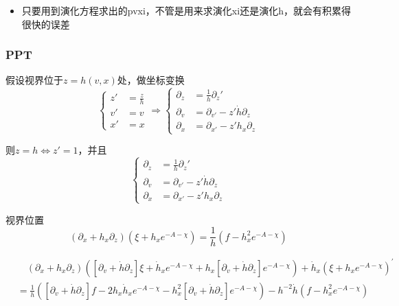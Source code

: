 \documentclass[12pt,a4paper]{ctexart}
\numberwithin{equation}{section}
\begin{document}
\begin{itemize}
    \item 只要用到演化方程求出的pvxi，不管是用来求演化xi还是演化h，就会有积累得很快的误差
\end{itemize}

\subsubsection{PPT}

假设视界位于$z=h(v,x)$处，做坐标变换
\begin{equation}
    \left\{
        \begin{aligned}
            z'&=\frac{z}{h}\\
            v'&=v\\
            x'&=x
        \end{aligned}
    \right.
    \Rightarrow
    \left\{
        \begin{aligned}
            \partial_z&=\frac{1}{h}\partial_z'\\
            \partial_v&=\partial_{v'}-z'\dot{h}\partial_z\\
            \partial_x&=\partial_{x'}-z'h_x\partial_z
        \end{aligned}
    \right.
\end{equation}

则$z=h\Leftrightarrow z'=1$，并且
\begin{equation}
    \left\{
        \begin{aligned}
            \partial_z&=\frac{1}{h}\partial_z'\\
            \partial_v&=\partial_{v'}-z'\dot{h}\partial_z\\
            \partial_x&=\partial_{x'}-z'h_x\partial_z
        \end{aligned}
    \right.
\end{equation}

视界位置
\begin{equation}
    (\partial_{x}+h_{x}\partial_{z})(\xi+h_{x}e^{-A-\chi})=\frac{1}{h}(f-h_{x}^{2}e^{-A-\chi})
\end{equation}

\begin{equation}
    \begin{aligned}
        &\quad(\partial_{x}+h_{x}\partial_{z})([\partial_{v}+\dot{h}\partial_{z}]\xi+\dot{h}_{x}e^{-A-\chi}+h_{x}[\partial_{v}+\dot{h}\partial_{z}]e^{-A-\chi})+\dot{h}_{x}(\xi+h_{x}e^{-A-\chi})^{\prime}\\
        &=\frac{1}{h}([\partial_{v}+\dot{h}\partial_{z}]f-2h_{x}\dot{h}_{x}e^{-A-\chi}-h_{x}^{2}[\partial_{v}+\dot{h}\partial_{z}]e^{-A-\chi})-h^{-2}\dot{h}(f-h_{x}^{2}e^{-A-\chi})
    \end{aligned}
\end{equation}
\end{document}
